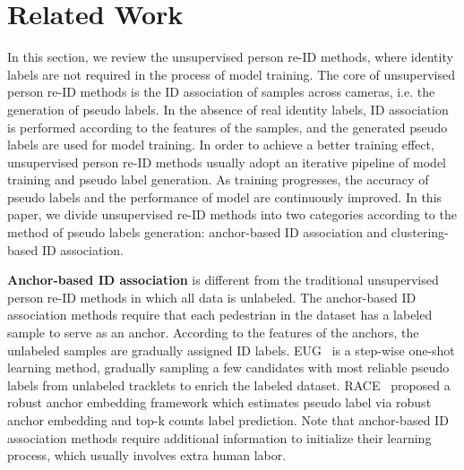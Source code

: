 \documentclass[10pt,twocolumn,letterpaper]{article}
\begin{document}
\section{Related Work}

In this section, we review the unsupervised person re-ID methods, where identity labels are not required in the process of model training. The core of unsupervised person re-ID methods is the ID association of samples across cameras, i.e. the generation of pseudo labels. In the absence of real identity labels, ID association is performed according to the features of the samples, and the generated pseudo labels are used for model training. In order to achieve a better training effect, unsupervised person re-ID methods usually adopt an iterative pipeline of model training and pseudo label generation. As training progresses, the accuracy of pseudo labels and the performance of model are continuously improved. In this paper, we divide unsupervised re-ID methods into two categories according to the method of pseudo labels generation: anchor-based ID association and clustering-based ID association.

\noindent \textbf{Anchor-based ID association} is different from the traditional unsupervised person re-ID methods in which all data is unlabeled. The anchor-based ID association methods require that each pedestrian in the dataset has a labeled sample to serve as an anchor. According to the features of the anchors, the unlabeled samples are gradually assigned ID labels. EUG~\cite{eug} is a step-wise one-shot learning method, gradually sampling a few candidates with most reliable pseudo labels from unlabeled tracklets to enrich the labeled dataset. RACE~\cite{race} proposed a robust anchor embedding framework which estimates pseudo label via robust anchor embedding and top-k counts label prediction. Note that anchor-based ID association methods require additional information to initialize their learning process, which usually involves extra human labor.
\end{document}
